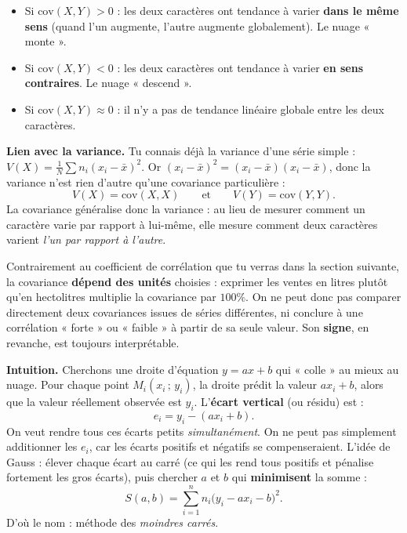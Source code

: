 \documentclass[11pt]{article}
\newcommand{\cle}[1]{{\popxbold\color{popdark}#1}}
\newcounter{popsec}
\newcounter{popsub}
\newcommand{\courssub}[1]{%
  \stepcounter{popsub}%
  \par\vspace{9pt}\noindent{\popxbold\fontsize{11.5}{13}\selectfont\color{popink}{\color{poporange}\thepopsec.\thepopsub}\hspace{6pt}#1}\par\nopagebreak\vspace{4pt}
}
\begin{document}
\begin{aretenir}
\begin{itemize}
\item Si $\mathrm{cov}(X,Y)>0$ : les deux caractères ont tendance à varier \textbf{dans le même sens} (quand l'un augmente, l'autre augmente globalement). Le nuage « monte ».
\item Si $\mathrm{cov}(X,Y)<0$ : les deux caractères ont tendance à varier \textbf{en sens contraires}. Le nuage « descend ».
\item Si $\mathrm{cov}(X,Y)\approx 0$ : il n'y a pas de tendance linéaire globale entre les deux caractères.
\end{itemize}
\end{aretenir}

\textbf{Lien avec la variance.} Tu connais déjà la variance d'une série simple : $V(X)=\frac{1}{N}\sum n_i(x_i-\bar{x})^2$. Or $(x_i-\bar{x})^2=(x_i-\bar{x})(x_i-\bar{x})$, donc la variance n'est rien d'autre qu'une covariance particulière :
\[
V(X)=\mathrm{cov}(X,X)\qquad\text{et}\qquad V(Y)=\mathrm{cov}(Y,Y).
\]
La covariance généralise donc la variance : au lieu de mesurer comment un caractère varie par rapport à lui-même, elle mesure comment deux caractères varient \emph{l'un par rapport à l'autre}.

\begin{attention}
Contrairement au coefficient de corrélation que tu verras dans la section suivante, la covariance \textbf{dépend des unités} choisies : exprimer les ventes en litres plutôt qu'en hectolitres multiplie la covariance par $100\%$. On ne peut donc pas comparer directement deux covariances issues de séries différentes, ni conclure à une corrélation « forte » ou « faible » à partir de sa seule valeur. Son \textbf{signe}, en revanche, est toujours interprétable.
\end{attention}

\courssub{Le principe des moindres carrés}

\textbf{Intuition.} Cherchons une droite d'équation $y=ax+b$ qui « colle » au mieux au nuage. Pour chaque point $M_i(x_i\,;\,y_i)$, la droite prédit la valeur $ax_i+b$, alors que la valeur réellement observée est $y_i$. L'\textbf{écart vertical} (ou \cle{résidu}) est :
\[
e_i=y_i-(ax_i+b).
\]
On veut rendre tous ces écarts petits \emph{simultanément}. On ne peut pas simplement additionner les $e_i$, car les écarts positifs et négatifs se compenseraient. L'idée de Gauss : élever chaque écart au carré (ce qui les rend tous positifs et pénalise fortement les gros écarts), puis chercher $a$ et $b$ qui \textbf{minimisent} la somme :
\[
S(a,b)=\sum_{i=1}^{n}n_i\bigl(y_i-ax_i-b\bigr)^2.
\]
D'où le nom : méthode des \emph{moindres carrés}.
\end{document}
